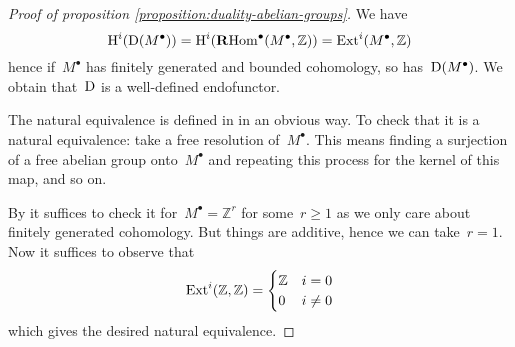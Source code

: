 \begin{proof}[Proof of proposition \ref{proposition:duality-abelian-groups}]
  We have
  \begin{equation}
    \operatorname{H}^i(\operatorname{D}(M^\bullet))=\operatorname{H}^i(\operatorname{\mathbf{R}Hom}^\bullet(M^\bullet,\mathbb{Z}))=\operatorname{Ext}^i(M^\bullet,\mathbb{Z})
  \end{equation}
  hence if~$M^\bullet$ has finitely generated and bounded cohomology, so has~$\operatorname{D}(M^\bullet)$. We obtain that~$\operatorname{D}$ is a well-defined endofunctor.

  The natural equivalence is defined in \cite[lemma V.1.2]{hartshorne-residues-and-duality} in an obvious way. To check that it is a natural equivalence: take a free resolution of~$M^\bullet$. This means finding a surjection of a free abelian group onto~$M^\bullet$ and repeating this process for the kernel of this map, and so on.
  
  By \cite[lemma I.7.1]{hartshorne-residues-and-duality} it suffices to check it for~$M^\bullet=\mathbb{Z}^r$ for some~$r\geq 1$ as we only care about finitely generated cohomology. But things are additive, hence we can take~$r=1$. Now it suffices to observe that
  \begin{equation}
    \operatorname{Ext}^i(\mathbb{Z},\mathbb{Z})=
    \begin{cases}
      \mathbb{Z} & i=0 \\
      0 & i\neq 0
    \end{cases}
  \end{equation}
  which gives the desired natural equivalence.
\end{proof}


